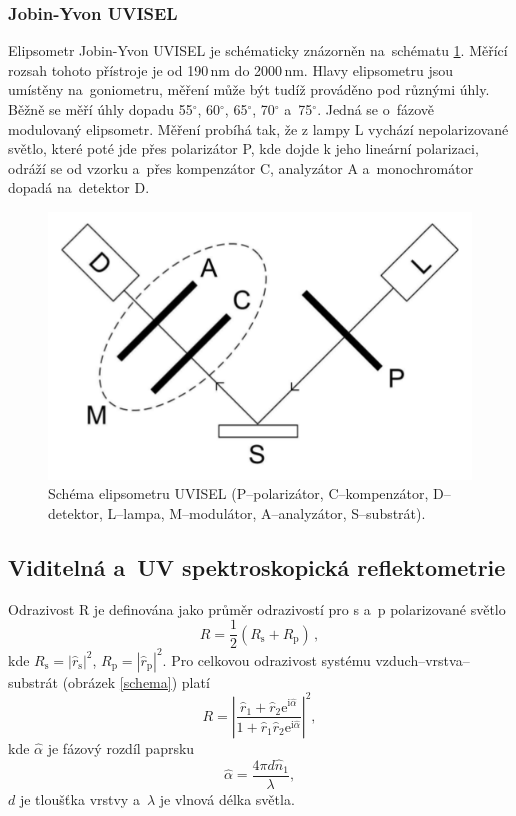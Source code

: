 \documentclass[12pt]{article}
\begin{document}
\subsubsection{Jobin-Yvon UVISEL}
Elipsometr Jobin-Yvon UVISEL je schématicky znázorněn na~schématu \ref{fig:elipsometrimg}.  Měřící rozsah tohoto přístroje je od 190\,nm do 2000\,nm. Hlavy elipsometru jsou umístěny na~goniometru, měření může být tudíž prováděno pod různými úhly. Běžně se měří úhly dopadu 55$^\circ$, 60$^\circ$, 65$^\circ$, 70$^\circ$ a~75$^\circ$. Jedná se o~fázově modulovaný elipsometr. Měření probíhá tak, že z lampy L vychází  nepolarizované světlo, které poté jde přes polarizátor P, kde dojde k jeho lineární polarizaci, odráží se od vzorku a~přes kompenzátor C, analyzátor A a~monochromátor dopadá na~detektor D.


\begin{figure}
  \centering
  \includegraphics[width=120mm]{schema-elipsometru.png}
  \caption{Schéma elipsometru UVISEL (P--polarizátor, C--kompenzátor, D--detektor, L--lampa, M--modulátor, A--analyzátor, S--substrát).}
  \label{fig:elipsometrimg}
\end{figure}


\subsection{Viditelná a~UV spektroskopická reflektometrie}
Odrazivost R je definována jako průměr odrazivostí pro s a~p polarizované světlo 
%
\begin{equation} R = \frac{1}{2}(R_\mathrm{s} + R_\mathrm{p})\, \mathrm{,}\end{equation}
%
kde $R_\mathrm{s} = |\hat{r}_\mathrm{s}|^2$, $R_\mathrm{p} = |\hat{r}_\mathrm{p}|^2$.
Pro celkovou odrazivost systému vzduch--vrstva--substrát (obrázek \ref{schema}) platí 
\begin{equation} R = \left|\frac{\hat{r}_1 + \hat{r}_2 \mathrm{e}^{\mathrm{i}\hat{\alpha}} }{1 + \hat{r}_1 \hat{r}_2 \mathrm{e}^{\mathrm{i}\hat{\alpha}}}\right|^2 \mathrm{,} \label{Rvzo}\end{equation}
%
kde $\hat{\alpha}$ je fázový rozdíl paprsku  
\begin{equation} \hat{\alpha} = \frac{ 4 \pi d \hat{n}_1}{\lambda} \mathrm{,}\end{equation}
%
$d$ je tloušťka vrstvy a~$\lambda$ je vlnová délka světla. 
\end{document}
